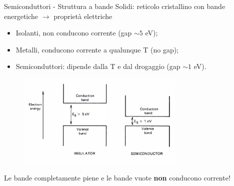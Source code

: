 \documentclass{beamer}
\begin{document}
\begin{frame}{Semiconduttori - Struttura a bande}
    Solidi: reticolo cristallino con bande energetiche $\to$ proprietà elettriche
    \begin{itemize}
        \item Isolanti, non conducono corrente (gap $\sim 5$ eV);
        \item Metalli, conducono corrente a qualunque T (no gap);
        \item Semiconduttori: dipende dalla T e dal drogaggio (gap $\sim 1$ eV).
    \end{itemize}
    \begin{figure}
\includegraphics[width=8cm]{images/bandgap.PNG}
\end{figure}
Le bande completamente piene e le bande vuote \textbf{non} conducono corrente!
\end{frame}

\end{document}
